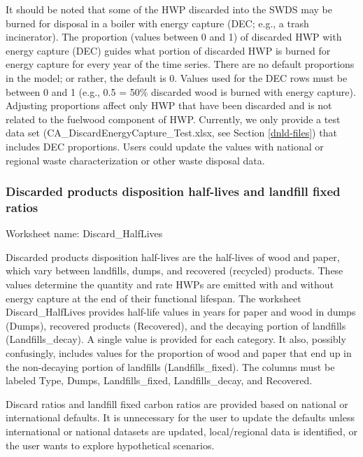 \documentclass[
  openany]{book}
\begin{document}
It should be noted that some of the HWP discarded into the SWDS may be burned for disposal in a boiler with energy capture (DEC; e.g., a trash incinerator). The proportion (values between 0 and 1) of discarded HWP with energy capture (DEC) guides what portion of discarded HWP is burned for energy capture for every year of the time series. There are no default proportions in the model; or rather, the default is 0. Values used for the DEC rows must be between 0 and 1 (e.g., 0.5 = 50\% discarded wood is burned with energy capture). Adjusting proportions affect only HWP that have been discarded and is not related to the fuelwood component of HWP. Currently, we only provide a test data set (CA\_DiscardEnergyCapture\_Test.xlsx, see Section \ref{dnld-files}) that includes DEC proportions. Users could update the values with national or regional waste characterization or other waste disposal data.

\hypertarget{own-prov-input-discHL}{%
\subsubsection{Discarded products disposition half-lives and landfill fixed ratios}\label{own-prov-input-discHL}}

Worksheet name: Discard\_HalfLives

Discarded products disposition half-lives are the half-lives of wood and paper, which vary between landfills, dumps, and recovered (recycled) products. These values determine the quantity and rate HWPs are emitted with and without energy capture at the end of their functional lifespan. The worksheet Discard\_HalfLives provides half-life values in years for paper and wood in dumps (Dumps), recovered products (Recovered), and the decaying portion of landfills (Landfills\_decay). A single value is provided for each category. It also, possibly confusingly, includes values for the proportion of wood and paper that end up in the non-decaying portion of landfills (Landfills\_fixed). The columns must be labeled Type, Dumps, Landfills\_fixed, Landfills\_decay, and Recovered.

Discard ratios and landfill fixed carbon ratios are provided based on national or international defaults. It is unnecessary for the user to update the defaults unless international or national datasets are updated, local/regional data is identified, or the user wants to explore hypothetical scenarios.
\end{document}
